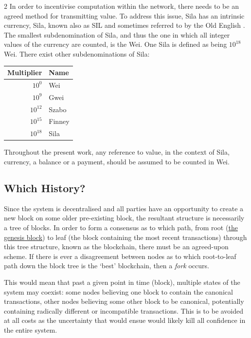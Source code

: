 \documentclass[9pt,oneside]{amsart}
\begin{document}
\begin{multicols}{2}
In order to incentivise computation within the network, there needs to be an agreed method for transmitting value. To address this issue, Sila has an intrinsic currency, Sila, known also as {\small SIL} and sometimes referred to by the Old English \DH{}. The smallest subdenomination of Sila, and thus the one in which all integer values of the currency are counted, is the Wei. One Sila is defined as being $10^{18}$ Wei. There exist other subdenominations of Sila:
\par
\begin{center}
\begin{tabular}{rl}
\toprule
Multiplier & Name \\
\midrule
$10^0$ & Wei \\
$10^9$ & Gwei \\
$10^{12}$ & Szabo \\
$10^{15}$ & Finney \\
$10^{18}$ & Sila \\
\bottomrule
\end{tabular}
\end{center}
\par

Throughout the present work, any reference to value, in the context of Sila, currency, a balance or a payment, should be assumed to be counted in Wei.

\subsection{Which History?}

Since the system is decentralised and all parties have an opportunity to create a new block on some older pre-existing block, the resultant structure is necessarily a tree of blocks. In order to form a consensus as to which path, from root (\hyperlink{Genesis_Block}{the genesis block}) to leaf (the block containing the most recent transactions) through this tree structure, known as the blockchain, there must be an agreed-upon scheme. If there is ever a disagreement between nodes as to which root-to-leaf path down the block tree is the `best' blockchain, then a \textit{fork} occurs.

This would mean that past a given point in time (block), multiple states of the system may coexist: some nodes believing one block to contain the canonical transactions, other nodes believing some other block to be canonical, potentially containing radically different or incompatible transactions. This is to be avoided at all costs as the uncertainty that would ensue would likely kill all confidence in the entire system.


\end{multicols}
\end{document}
